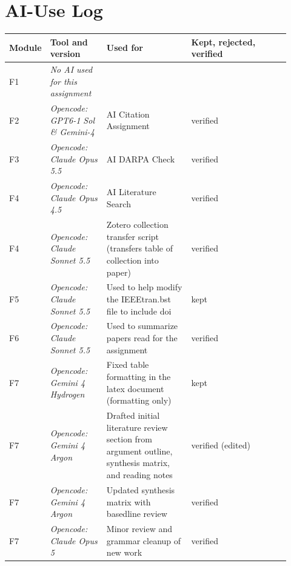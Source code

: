 
\section{AI-Use Log}

\begin{longtable}{@{}p{0.07\linewidth}p{0.2\linewidth}p{0.3\linewidth}p{0.35\linewidth}@{}}
  \toprule
  Module & Tool and version & Used for & Kept, rejected, verified \\
  \midrule
  \endhead
  F1 & \textit{No AI used for this assignment} & & \\
  F2 & \textit{Opencode: GPT6-1 Sol \& Gemini-4} & AI Citation Assignment & verified \\
  F3 & \textit{Opencode: Claude Opus 5.5} & AI DARPA Check & verified \\
  F4 & \textit{Opencode: Claude Opus 4.5} & AI Literature Search & verified \\
  F4 & \textit{Opencode: Claude Sonnet 5.5} & Zotero collection transfer script (transfers table of collection into paper) & verified \\
  F5 & \textit{Opencode: Claude Sonnet 5.5} & Used to help modify the IEEEtran.bst file to include doi & kept \\
  F6 & \textit{Opencode: Claude Sonnet 5.5} & Used to summarize papers read for the assignment & verified \\
  F7 & \textit{Opencode: Gemini 4 Hydrogen} & Fixed table formatting in the latex document (formatting only) & kept \\
  F7 & \textit{Opencode: Gemini 4 Argon} & Drafted initial literature review section from argument outline, synthesis matrix, and reading notes & verified (edited) \\
  F7 & \textit{Opencode: Gemini 4 Argon} & Updated synthesis matrix with basedline review & verified  \\
  F7 & \textit{Opencode: Claude Opus 5} & Minor review and grammar cleanup of new work & verified \\
  \bottomrule
\end{longtable}
